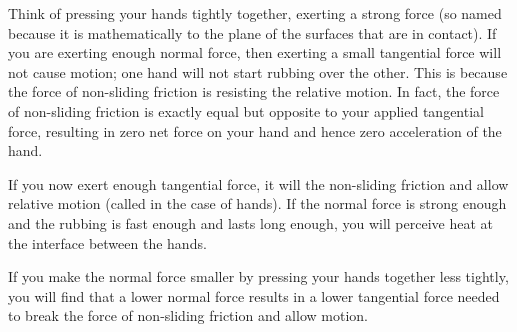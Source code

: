 {
Think of pressing your hands tightly together, exerting a strong 
force (so named because it is mathematically  to the plane of the
surfaces that are in contact).
If you are exerting enough normal force, then exerting a small tangential
force will not cause motion; one hand will not start rubbing over the other.
This is because the force of non-sliding friction is resisting the relative
motion.
In fact, the force of non-sliding friction is exactly equal but opposite to
your applied tangential force, resulting in zero net force on your hand and
hence zero acceleration of the hand.

If you now exert enough tangential force, it will  the non-sliding
friction and allow relative motion (called  in the case of
hands).
If the normal force is strong enough and the rubbing is fast enough and
lasts long enough, you will perceive heat at the interface between the
hands.

If you make the normal force smaller by pressing your hands together
less tightly, you will find that a lower normal force results in a lower
tangential force needed to break the force of non-sliding friction and allow
motion.

}%
%

